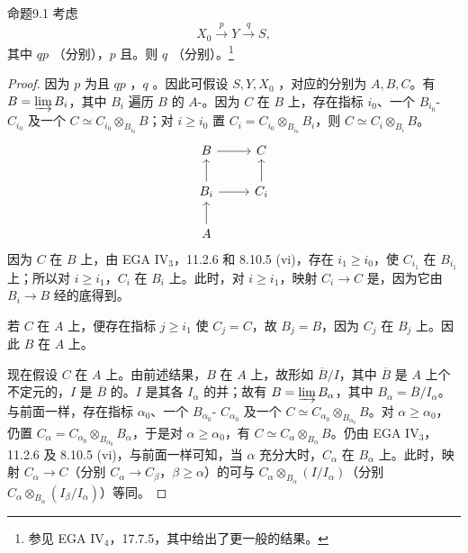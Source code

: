 \begin{SGAresult}{命题}{9.1}
考虑
\[
X_0\xrightarrow{p}Y\xrightarrow{q}S,
\]
其中 $qp$ （分别），$p$ 且。则 $q$ （分别）。\begingroup\renewcommand{\thefootnote}{*}\footnote{参见 EGA IV$_4$，17.7.5，其中给出了更一般的结果。}\addtocounter{footnote}{-1}\endgroup{}
\end{SGAresult}
\begin{proof}
因为 $p$ 为且 $qp$ ，$q$ 。因此可假设 $S,Y,X_0$ ，对应的分别为 $A,B,C$。有 $B=\varinjlim B_i$，其中 $B_i$ 遍历 $B$ 的 $A$-。因为 $C$ 在 $B$ 上，存在指标 $i_0$、一个 $B_{i_0}$- $C_{i_0}$ 及一个 $C\simeq C_{i_0}\otimes_{B_{i_0}}B$；对 $i\geq i_0$ 置 $C_i=C_{i_0}\otimes_{B_{i_0}}B_i$，则 $C\simeq C_i\otimes_{B_i}B$。
\[
\begin{tikzcd}
B\arrow[r]&C\\
B_i\arrow[u]\arrow[r]&C_i\arrow[u]\\
A\arrow[u]&
\end{tikzcd}
\]
因为 $C$ 在 $B$ 上，由 EGA IV$_3$，11.2.6 和 8.10.5 (vi)，存在 $i_1\geq i_0$，使 $C_{i_1}$ 在 $B_{i_1}$ 上；所以对 $i\geq i_1$，$C_i$ 在 $B_i$ 上。此时，对 $i\geq i_1$，映射 $C_i\to C$ 是，因为它由 $B_i\to B$ 经的底得到。

若 $C$ 在 $A$ 上，便存在指标 $j\geq i_1$ 使 $C_j=C$，故 $B_j=B$，因为 $C_j$ 在 $B_j$ 上。因此 $B$ 在 $A$ 上。

现在假设 $C$ 在 $A$ 上。由前述结果，$B$ 在 $A$ 上，故形如 $\overline B/I$，其中 $\overline B$ 是 $A$ 上个不定元的，$I$ 是 $\overline B$ 的。$I$ 是其各 $I_\alpha$ 的并；故有 $B=\varinjlim B_\alpha$，其中 $B_\alpha=\overline B/I_\alpha$。与前面一样，存在指标 $\alpha_0$、一个 $B_{\alpha_0}$- $C_{\alpha_0}$ 及一个 $C\simeq C_{\alpha_0}\otimes_{B_{\alpha_0}}B$。对 $\alpha\geq\alpha_0$，仍置 $C_\alpha=C_{\alpha_0}\otimes_{B_{\alpha_0}}B_\alpha$，于是对 $\alpha\geq\alpha_0$，有 $C\simeq C_\alpha\otimes_{B_\alpha}B$。仍由 EGA IV$_3$，11.2.6
及 8.10.5 (vi)，与前面一样可知，当 $\alpha$ 充分大时，$C_\alpha$ 在 $B_\alpha$ 上。此时，映射 $C_\alpha\to C$（分别 $C_\alpha\to C_\beta$，$\beta\geq\alpha$）的可与 $C_\alpha\otimes_{B_\alpha}(I/I_\alpha)$（分别 $C_\alpha\otimes_{B_\alpha}(I_\beta/I_\alpha)$）等同。


\end{proof}
